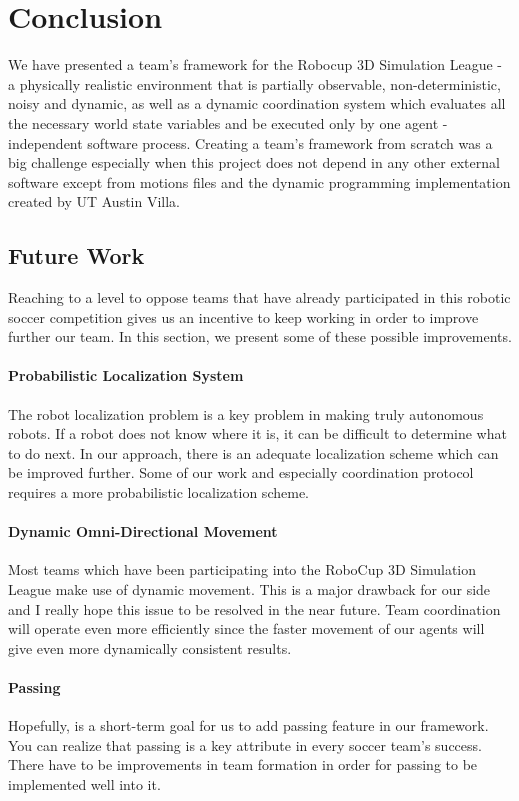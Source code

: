 \chapter{Conclusion}
\label{conclusion}

We have presented a team's framework for the Robocup 3D Simulation League - a physically realistic environment that is partially observable, non-deterministic, noisy and dynamic, as well as a dynamic coordination system which evaluates all the necessary world state variables and be executed only by one agent -independent software process. Creating a team's framework from scratch was a big challenge especially when this project does not depend in any other external software except from motions files and the dynamic programming implementation created by UT Austin Villa. 

\section{Future Work}
Reaching to a level to oppose teams that have already participated in this robotic soccer competition gives us an incentive to keep working in order to improve further our team. In this section, we present some of these possible improvements.  


\subsubsection*{Probabilistic Localization System}
The robot localization problem is a key problem in making truly autonomous robots. If a robot does not know where it is, it can be difficult to determine what to do next. In our approach, there is an adequate localization scheme which can be improved further. Some of our work and especially coordination protocol  requires a more probabilistic localization scheme.


\subsubsection*{Dynamic Omni-Directional Movement}
Most teams which have been participating into the RoboCup 3D Simulation League make use of dynamic movement. This is a major drawback for our side and I really hope this issue to be resolved in the near future. Team coordination will operate even more efficiently since the faster movement of our agents will give even more dynamically consistent results. 


\subsubsection*{Passing}
Hopefully, is a short-term goal for us to add passing feature in our framework. You can realize that passing is a key attribute in every soccer team's success. There have to be improvements in team formation in order for passing to be implemented well into it.


